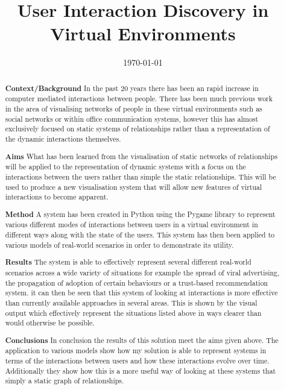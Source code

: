 \documentclass[12pt,a4paper]{article}
\title{User Interaction Discovery in Virtual Environments}
\date{\today}
\begin{document}
\maketitle

\begin{abstract}

{\bf Context/Background}
\noindent
In the past 20 years there has been an rapid increase in computer mediated interactions between people. There has been much previous work in the area of visualising networks of people in these virtual environments such as social networks or within office communication systems, however this has almost exclusively focused on static systems of relationships rather than a representation of the dynamic interactions themselves.

{\bf Aims}
\noindent
What has been learned from the visualisation of static networks of relationships will be applied to the representation of dynamic systems with a focus on the interactions between the users rather than simple the static relationships. This will be used to produce a new visualisation system that will allow new features of virtual interactions to become apparent.

{\bf Method}
\noindent
A system has been created in Python using the Pygame library to represent various different modes of interactions between users in a virtual environment in different ways along with the state of the users. This system has then been applied to various models of real-world scenarios in order to demonstrate its utility.

{\bf Results}
\noindent
The system is able to effectively represent several different real-world scenarios across a wide variety of situations for example the spread of viral advertising, the propagation of adoption of certain behaviours or a trust-based recommendation system. it can then be seen that this system of looking at interactions is more effective than currently available approaches in several areas. This is shown by the visual output which effectively represent the situations listed above in ways clearer than would otherwise be possible.

{\bf Conclusions}
\noindent
In conclusion the results of this solution meet the aims given above. The application to various models show how my solution is able to represent systems in terms of the interactions between users and how these interactions evolve over time. Additionally they show how this is a more useful way of looking at these systems that simply a static graph of relationships.

\end{abstract}
\end{document}
